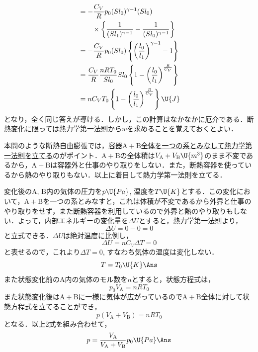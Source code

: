 \begin{multicols}{2}
\begin{komon}
\begin{bekkai}
\[\begin{aligned}
          &=-\frac{C_V}{R}p_0(Sl_0)^{\gamma-1}(Sl_0)\\
          &\qquad\times\left\{\frac{1}{(Sl_1)^{\gamma-1}}-\frac{1}{(Sl_0)^{\gamma-1}}\right\}\\
          &=-\frac{C_V}{R}p_0(Sl_0)\left\{\left(\frac{l_0}{l_1}\right)^{\gamma-1}-1\right\}\\
          &=\frac{C_V}{R}\frac{nRT_0}{Sl_0}Sl_0\left\{1-\left(\frac{l_0}{l_1}\right)^{\frac{R}{C_V}}\right\}\\
          &=nC_VT_0\left\{1-\left(\frac{l_0}{l_1}\right)^{\frac{R}{C_V}}\right\}\U{J}
       \end{aligned}\]
       となり，全く同じ答えが導ける．しかし，この計算はなかなかに厄介である．断熱変化に限っては熱力学第一法則から$w$を求めることを覚えておくとよい．
       \end{bekkai}
\end{komon}

\par\nopagebreak
\begin{sisin}
本問のような断熱自由膨張では，\underline{容器$\mathrm{A+B}$}\hskip0pt\underline{全体を一}\hskip0pt\underline{つの系と}\hskip0pt\underline{みなして}\hskip0pt\underline{熱力学第}\hskip0pt\underline{一法則を}\hskip0pt\underline{立てる}のがポイント．$\mathrm{A+B}$の全体積は$V_\mathrm{A}+V_\mathrm{B}\U{m^3}$のまま不変であるから，$\mathrm{A+B}$は容器外と仕事のやり取りをしない．また，断熱容器を使っているから熱のやり取りもない．以上に着目して熱力学第一法則を立てる．
\end{sisin}
\KaiHead
変化後の$\mathrm{A}$, $\mathrm{B}$内の気体の圧力を$p\U{Pa}$, 温度を$T\U{K}$とする．この変化において，$\mathrm{A+B}$を一つの系とみなすと，これは体積が不変であるから外界と仕事のやり取りをせず，また断熱容器を利用しているので外界と熱のやり取りもしない．よって，内部エネルギーの変化量を$\Delta U$とすると，熱力学第一法則より，
\[\Delta U=0-0=0\]
と立式できる．$\Delta U$は絶対温度に比例し，
\[\Delta U=nC_V\Delta T=0\]
と表せるので，これより$\Delta T=0$, すなわち気体の温度は変化しない．
\[T=T_0\U{K}\Ans\]
また状態変化前の$\mathrm{A}$内の気体のモル数を$n$とすると，状態方程式は，
\[p_0V_\mathrm{A}=nRT_0\]
また状態変化後は$\mathrm{A+B}$に一様に気体が広がっているので$\mathrm{A+B}$全体に対して状態方程式を立てることができ，
\[p(V_\mathrm{A}+V_\mathrm{B})=nRT_0\]
となる．以上2式を組み合わせて，
\[p=\frac{V_\mathrm{A}}{V_\mathrm{A}+V_\mathrm{B}}p_0\U{Pa}\Ans\]


\end{multicols}
